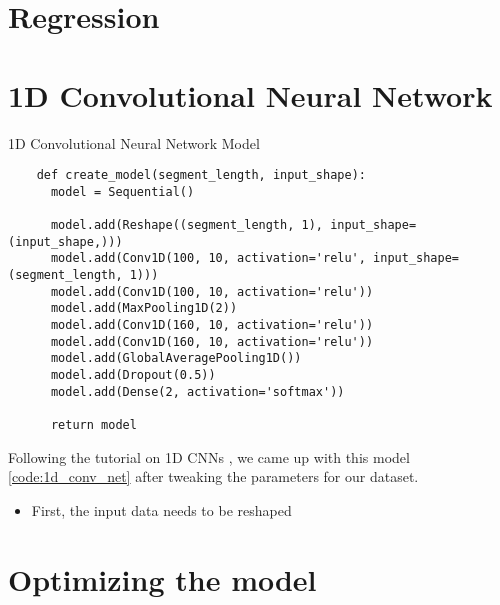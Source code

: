 \section{Regression}

\section{1D Convolutional Neural Network}

\begin{code}
  \caption{1D Convolutional Neural Network Model}
  \label{code:1d_conv_net}
  
  \begin{verbatim}
    def create_model(segment_length, input_shape):
      model = Sequential()

      model.add(Reshape((segment_length, 1), input_shape=(input_shape,)))
      model.add(Conv1D(100, 10, activation='relu', input_shape=(segment_length, 1)))
      model.add(Conv1D(100, 10, activation='relu'))
      model.add(MaxPooling1D(2))
      model.add(Conv1D(160, 10, activation='relu'))
      model.add(Conv1D(160, 10, activation='relu'))
      model.add(GlobalAveragePooling1D())
      model.add(Dropout(0.5))
      model.add(Dense(2, activation='softmax'))

      return model
  \end{verbatim}
\end{code}

Following the tutorial on 1D CNNs \cite{1d_cnn}, we came up with this model \ref{code:1d_conv_net} after tweaking the parameters for our dataset.
 
\begin{itemize}
  \item First, the input data needs to be reshaped
\end{itemize}
\section{Optimizing the model}